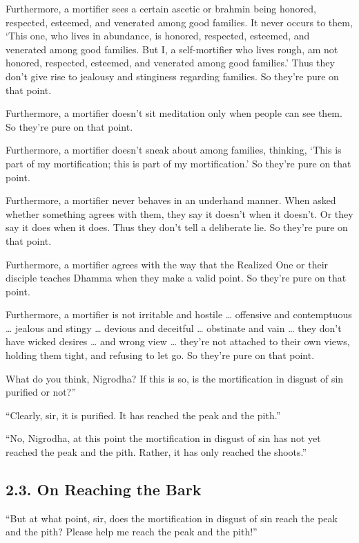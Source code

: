 \documentclass[12pt,openany]{book}%
\begin{document}
Furthermore, a mortifier sees a certain ascetic or brahmin being honored, respected, esteemed, and venerated among good families. It never occurs to them, ‘This one, who lives in abundance, is honored, respected, esteemed, and venerated among good families. But I, a self-mortifier who lives rough, am not honored, respected, esteemed, and venerated among good families.’ Thus they don’t give rise to jealousy and stinginess regarding families. So they’re pure on that point. 

Furthermore, a mortifier doesn’t sit meditation only when people can see them. So they’re pure on that point. 

Furthermore, a mortifier doesn’t sneak about among families, thinking, ‘This is part of my mortification; this is part of my mortification.’ So they’re pure on that point. 

Furthermore, a mortifier never behaves in an underhand manner. When asked whether something agrees with them, they say it doesn’t when it doesn’t. Or they say it does when it does. Thus they don’t tell a deliberate lie. So they’re pure on that point. 

Furthermore, a mortifier agrees with the way that the Realized One or their disciple teaches Dhamma when they make a valid point. So they’re pure on that point. 

Furthermore, a mortifier is not irritable and hostile … offensive and contemptuous … jealous and stingy … devious and deceitful … obstinate and vain … they don’t have wicked desires … and wrong view … they’re not attached to their own views, holding them tight, and refusing to let go. So they’re pure on that point. 

What do you think, Nigrodha? If this is so, is the mortification in disgust of sin purified or not?” 

“Clearly, sir, it is purified. It has reached the peak and the pith.” 

“No, Nigrodha, at this point the mortification in disgust of sin has not yet reached the peak and the pith. Rather, it has only reached the shoots.” 

\subsection*{2.3. On Reaching the Bark }

“But at what point, sir, does the mortification in disgust of sin reach the peak and the pith? Please help me reach the peak and the pith!” 
\end{document}
